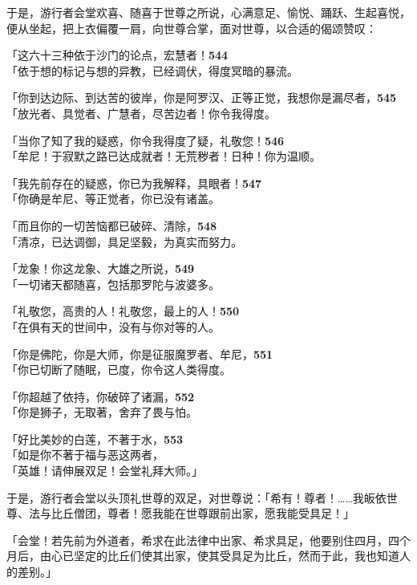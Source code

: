 于是，游行者会堂欢喜、随喜于世尊之所说，心满意足、愉悦、踊跃、生起喜悦，便从坐起，把上衣偏覆一肩，向世尊合掌，面对世尊，以合适的偈颂赞叹：

「这六十三种依于沙门的论点，宏慧者！\hfill{\grayfootnotesize \textbf{544}} \\
「依于想的标记与想的异教，已经调伏，得度冥暗的暴流。


「你到达边际、到达苦的彼岸，你是阿罗汉、正等正觉，我想你是漏尽者，\hfill{\grayfootnotesize \textbf{545}} \\
「放光者、具觉者、广慧者，尽苦边者！你令我得度。


「当你了知了我的疑惑，你令我得度了疑，礼敬您！\hfill{\grayfootnotesize \textbf{546}} \\
「牟尼！于寂默之路已达成就者！无荒秽者！日种！你为温顺。


「我先前存在的疑惑，你已为我解释，具眼者！\hfill{\grayfootnotesize \textbf{547}} \\
「你确是牟尼、等正觉者，你已没有诸盖。

「而且你的一切苦恼都已破碎、清除，\hfill{\grayfootnotesize \textbf{548}} \\
「清凉，已达调御，具足坚毅，为真实而努力。


「龙象！你这龙象、大雄之所说，\hfill{\grayfootnotesize \textbf{549}} \\
「一切诸天都随喜，包括那罗陀与波婆多。


「礼敬您，高贵的人！礼敬您，最上的人！\hfill{\grayfootnotesize \textbf{550}} \\
「在俱有天的世间中，没有与你对等的人。


「你是佛陀，你是大师，你是征服魔罗者、牟尼，\hfill{\grayfootnotesize \textbf{551}} \\
「你已切断了随眠，已度，你令这人类得度。


「你超越了依持，你破碎了诸漏，\hfill{\grayfootnotesize \textbf{552}} \\
「你是狮子，无取著，舍弃了畏与怕。


「好比美妙的白莲，不著于水，\hfill{\grayfootnotesize \textbf{553}} \\
「如是你不著于福与恶这两者，\\
「英雄！请伸展双足！会堂礼拜大师。」


于是，游行者会堂以头顶礼世尊的双足，对世尊说：「希有！尊者！……我皈依世尊、法与比丘僧团，尊者！愿我能在世尊跟前出家，愿我能受具足！」

「会堂！若先前为外道者，希求在此法律中出家、希求具足，他要别住四月，四个月后，由心已坚定的比丘们使其出家，使其受具足为比丘，然而于此，我也知道人的差别。」



